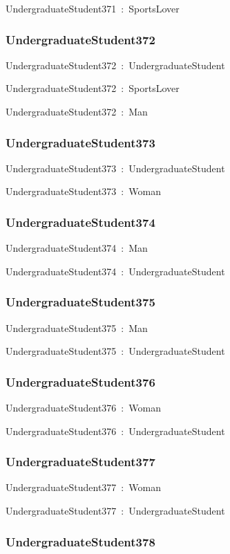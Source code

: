 \documentclass{article}
\begin{document}
UndergraduateStudent371~:~SportsLover

\subsubsection*{UndergraduateStudent372}

UndergraduateStudent372~:~UndergraduateStudent

UndergraduateStudent372~:~SportsLover

UndergraduateStudent372~:~Man

\subsubsection*{UndergraduateStudent373}

UndergraduateStudent373~:~UndergraduateStudent

UndergraduateStudent373~:~Woman

\subsubsection*{UndergraduateStudent374}

UndergraduateStudent374~:~Man

UndergraduateStudent374~:~UndergraduateStudent

\subsubsection*{UndergraduateStudent375}

UndergraduateStudent375~:~Man

UndergraduateStudent375~:~UndergraduateStudent

\subsubsection*{UndergraduateStudent376}

UndergraduateStudent376~:~Woman

UndergraduateStudent376~:~UndergraduateStudent

\subsubsection*{UndergraduateStudent377}

UndergraduateStudent377~:~Woman

UndergraduateStudent377~:~UndergraduateStudent

\subsubsection*{UndergraduateStudent378}
\end{document}
